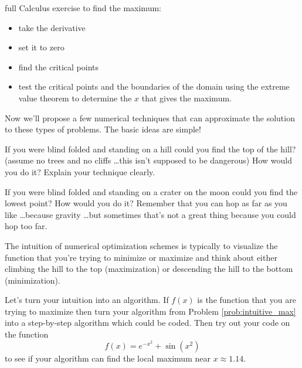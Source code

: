 \begin{problem}
\begin{enumerate}
            full Calculus exercise to find the maximum:
            \begin{itemize}
                \item take the derivative
                \item set it to zero
                \item find the critical points
                \item test the critical points and the boundaries of the domain using the
                    extreme value theorem to determine the $x$ that gives the maximum.
            \end{itemize}
    \end{enumerate}
\end{problem}


Now we'll propose a few numerical techniques that can approximate the solution to these
types of problems.  The basic ideas are simple!

\begin{problem}\label{prob:intuitive_max}
    If you were blind folded and standing on a hill could you find the top of the hill?
    (assume no trees and no cliffs \ldots this isn't supposed to be dangerous)  How would
    you do it?  Explain your technique clearly.
\end{problem}

\begin{problem}
    If you were blind folded and standing on a crater on the moon could you find the
    lowest point?  How would you do it?  Remember that you can hop as far as you like
    \ldots because gravity \ldots but sometimes that's not a great thing because you could
    hop too far.
\end{problem}

The intuition of numerical optimization schemes is typically to visualize the function that
you're trying to minimize or maximize and think about either climbing the hill to the top
(maximization) or descending the hill to the bottom (minimization).  

\begin{problem}
    Let's turn your intuition into an algorithm.  If $f(x)$ is the function that you are
    trying to maximize then turn your algorithm from Problem \ref{prob:intuitive_max} into
    a step-by-step algorithm which could be coded. Then try out your code on the function 
    \[ f(x) = e^{-x^2} + \sin(x^2) \]
    to see if your algorithm can find the local maximum near $x \approx 1.14$.
\end{problem}

